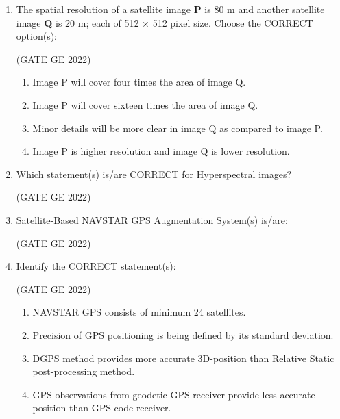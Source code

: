 \documentclass[journal,12pt,onecolumn]{IEEEtran}
\theoremstyle{remark}
\begin{document}
\begin{enumerate}
\item The spatial resolution of a satellite image \textbf{P} is 80 m and another satellite image \textbf{Q} is 20 m; each of 512 $\times$ 512 pixel size. Choose the CORRECT option(s):

\hfill (GATE GE 2022)

\begin{enumerate}
    \item Image P will cover four times the area of image Q.
    \item Image P will cover sixteen times the area of image Q.
    \item Minor details will be more clear in image Q as compared to image P.
    \item Image P is higher resolution and image Q is lower resolution.
\end{enumerate}

\item Which statement(s) is/are CORRECT for Hyperspectral images?

\hfill (GATE GE 2022)

\begin{enumerate}
\end{enumerate}

\item Satellite-Based NAVSTAR GPS Augmentation System(s) is/are:

\hfill (GATE GE 2022)

\begin{enumerate}
\end{enumerate}

\item Identify the CORRECT statement(s):

\hfill (GATE GE 2022)

\begin{enumerate}
    \item NAVSTAR GPS consists of minimum 24 satellites.
    \item Precision of GPS positioning is being defined by its standard deviation.
    \item DGPS method provides more accurate 3D-position than Relative Static post-processing method.
    \item GPS observations from geodetic GPS receiver provide less accurate position than GPS code receiver.
\end{enumerate}


\end{enumerate}
\end{document}
